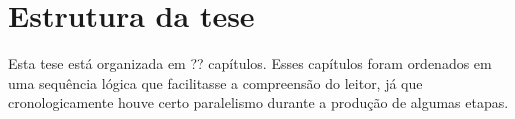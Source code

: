 \section{Estrutura da tese}
\label{Introducao:Estrutura}


Esta tese está organizada em ?? capítulos. Esses capítulos foram ordenados em uma sequência lógica que facilitasse a compreensão do leitor, já que cronologicamente houve certo paralelismo durante a produção de algumas etapas.

